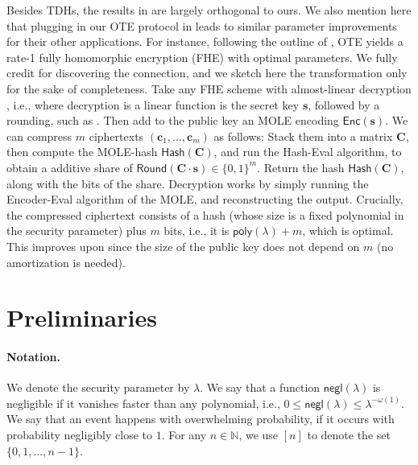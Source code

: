 \documentclass{article}
\newcommand{\N}{\mathbb{N}}
\newcommand{\poly}{\mathsf{poly}}
\newcommand{\negl}{\mathsf{negl}}
\renewcommand{\sec}{\ensuremath{\lambda}}
\begin{document}
Besides TDHs, the results in \cite{EC:BJSS25} are largely orthogonal to ours. We also mention here that plugging in our OTE protocol in \cite{EC:BJSS25} leads to similar parameter improvements for their other applications. For instance, following the outline of \cite{EC:BJSS25}, OTE yields a rate-1 fully homomorphic encryption (FHE) with optimal parameters. We fully credit \cite{EC:BJSS25} for discovering the connection, and we sketch here the transformation only for the sake of completeness. Take any FHE scheme with almost-linear decryption \cite{TCC:BDGM19}, i.e., where decryption is a linear function is the secret key $\mathbf{s}$, followed by a rounding, such as \cite{C:GenSahWat13}. Then add to the public key an MOLE encoding $\mathsf{Enc}(\mathbf{s})$. We can compress $m$ ciphertexts $(\mathbf{c}_1, \dots, \mathbf{c}_m)$ as follows: Stack them into a matrix $\mathbf{C}$, then compute the MOLE-hash $\mathsf{Hash}(\mathbf{C})$, and run the Hash-Eval algorithm, to obtain a additive share of $\mathsf{Round}(\mathbf{C}\cdot \mathbf{s}) \in \{0,1\}^m$. Return the hash $\mathsf{Hash}(\mathbf{C})$, along with the bits of the share. Decryption works by simply running the Encoder-Eval algorithm of the MOLE, and reconstructing the output. Crucially, the compressed ciphertext consists of a hash (whose size is a fixed polynomial in the security parameter) plus $m$ bits, i.e., it is $\poly(\lambda) + m$, which is optimal. This improves upon \cite{TCC:BDGM19} since the size of the public key does not depend on $m$ (no amortization is needed).

\section{Preliminaries}
\paragraph{Notation.}
We denote the security parameter by $\sec$. We say that a function $\negl(\sec)$ is negligible if it vanishes faster than any polynomial, i.e., $0\le \negl(\sec) \leq \sec^{-\omega(1)}$. We say that an event happens with overwhelming probability, if it occurs with probability negligibly close to $1$. For any $n\in\N$, we use $[n]$ to denote the set $\{0, 1, \dots, n-1\}$. 
\end{document}
